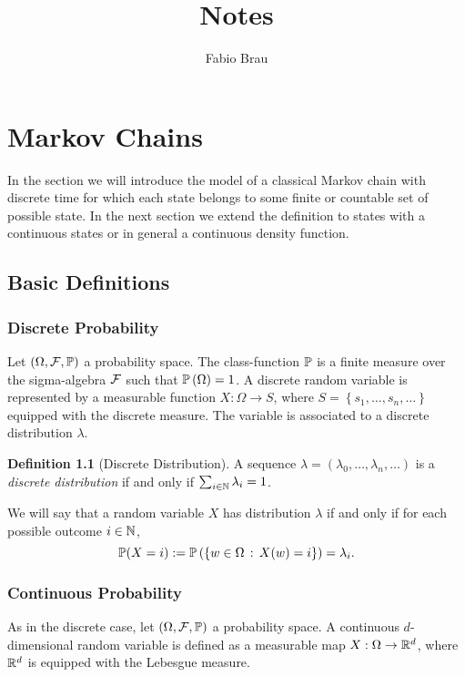 \documentclass{report}
\title{Notes}
\author{Fabio Brau}
\theoremstyle{definition}
\newtheorem{defn}{Definition}
\begin{document}
\maketitle
\tableofcontents
\chapter{Markov Chains}
In the section we will introduce the model of a classical Markov chain with
discrete time for which each state belongs to some finite or countable set of
possible state. In the next section we extend the definition to states with a
continuous states or in general a continuous density function.
\section{Basic Definitions}
\subsection{Discrete Probability}
Let $\left( \Omega, \mathcal{F}, \mathbb{P} \right)$ a probability space. The class-function $\mathbb{P}$
is a finite measure over the sigma-algebra $\mathcal{F}$ such that
$\mathbb{P}\left(\Omega\right)=1$. A discrete random variable is represented by a
measurable function $X:\Omega\to S$, where $S=\left\{ s_1,\dots,s_n,\dots
\right\}$ equipped with the discrete measure. The variable is associated to a discrete
distribution $\lambda$.
\begin{defn}[Discrete Distribution]
A sequence $\lambda=\left( \lambda_0,\dots,\lambda_n,\dots \right)$ is a
\textit{discrete distribution} if and only if $\sum_{i\in\mathbb{N}} \lambda_i = 1$.
\end{defn}

We will say that a random variable $X$ has distribution $\lambda$ if and only
if for each possible outcome $i\in\mathbb{N}$, 
\begin{equation}
  \mathbb{P}(X=i):= \mathbb{P}\left( \left\{ w\in\Omega\,:\, X(w)=i \right\}
  \right)=\lambda_i.
  \label{eq:discrete-distribution}
\end{equation}

\subsection{Continuous Probability}
As in the discrete case, let $\left( \Omega, \mathcal{F}, \mathbb{P} \right)$ a probability
space. A continuous $d$-dimensional random variable is defined as a measurable map
$X:\Omega\to\mathbb{R}^d$, where $\mathbb{R}^d$ is equipped with the Lebesgue measure.
\end{document}
